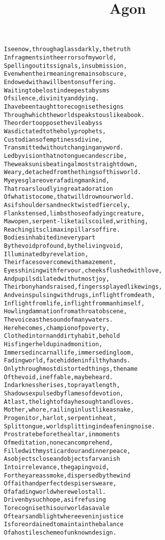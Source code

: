 \documentclass{article}
\title{Agon}
\begin{document}
\maketitle

\clearpage

\begin{alltt}\normalfont
I see now, through a glass darkly, the truth
In fragments in the errors of my world,
Spelling out its signals, in submission,
Even when their meaning remains obscure,
Endowed with a will bent on suffering.
Waiting to be lost in deepest abysms
Of silence, divinity and dying.
I have been taught to recognise the signs
Through which the world speaks to us like a book.
The order to oppose the vile abyss
Was dictated to the holy prophets,
Custodians of emptiness divine,
Transmitted without changing any word.
Led by vision that no tongue can describe,
The weak sun is beating almost straight down,
Weary, detached from the things of this world.
My eyes glare over a fading mankind,
That roars loudly in great adoration
Of what is to come, that will drown our world.
As if shoulders and neck twisted fiercely,
Flanks tensed, limbs those of a dying creature,
Maw open, serpent-like tails coiled, writhing,
Reaching its climax in pillars of fire.
Bodies inhabited in every part
By the void profound, by the living void,
Illuminated by revelation,
Their faces overcome with amazement,
Eyes shining with fervour, cheeks flushed with love,
And pupils dilated with utmost joy,
Their bony hands raised, fingers splayed like wings,
And veins pulsing with drugs, in flight from death,
In flight from life, in flight from man himself,
Howling damnation from a throat obscene,
The voice as the sound of many waters.
Here he comes, champion of poverty,
Clothed in torn and dirty habit, behold
His finger held up in admonition,
Immersed in carnal life, immersed in gloom,
Fading world, face hidden in filthy hands.
Only through most distorted things, the name
Of the void, ineffable, may be heard.
In darkness he rises, to pray at length,
Shadows expulsed by flames of devotion,
At last, the light of day he sought and loves.
Mother, whore, railing in lust like a snake,
Progenitor, harlot, serpent in heat,
Split tongue, world splitting in deafening noise.
Prostrate before the altar, in moments
Of meditation, none can comprehend,
Filled with mystic ardour and inner peace,
As objects close and objects far vanish
Into irrelevance, the gaping void,
For they are as smoke, dispersed by the wind
Of faith and perfect despisers we are,
Of a fading world where we lost all.
Driven by such hope, as if refusing
To recognise this our world as a vale
Of tears and blight where even injustice
Is foreordained to maintain the balance
Of a hostile scheme of unknown design.
\end{alltt}
\end{document}
